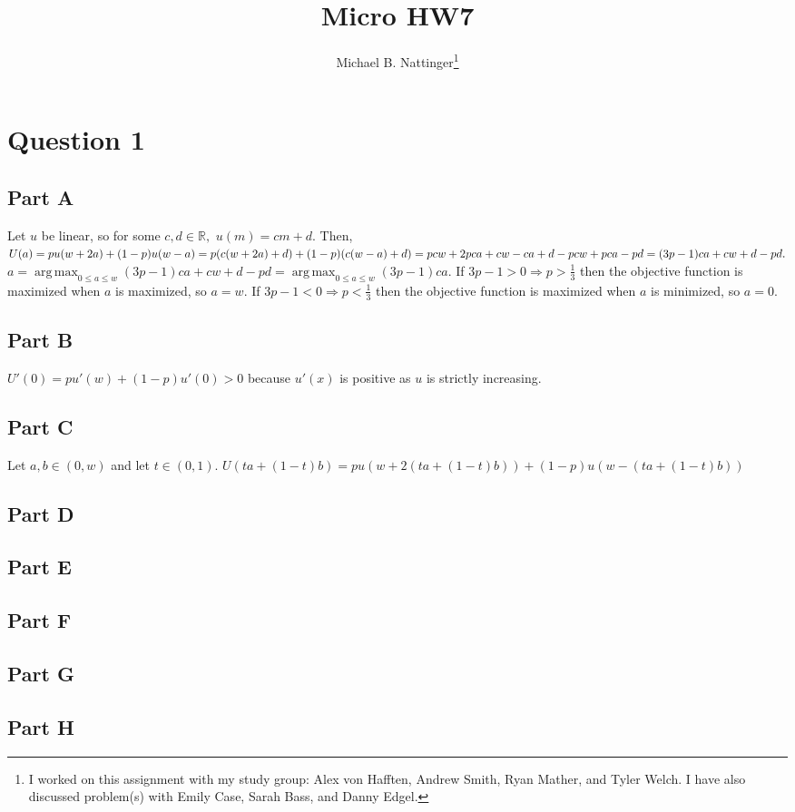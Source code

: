 \documentclass[11pt]{article} %
\title{Micro HW7}
\author{Michael B. Nattinger\footnote{I worked on this assignment with my study group: Alex von Hafften, Andrew Smith, Ryan Mather, and Tyler Welch. I have also discussed problem(s) with Emily Case, Sarah Bass, and Danny Edgel.}}
\DeclareMathOperator*{\argmax}{arg\,max}
\begin{document}
\maketitle

\section{Question 1}
\subsection{Part A}
Let $u$ be linear, so for some $c,d \in \mathbb{R},$ $u(m) = cm + d.$ Then, $U(a) = pu(w+2a ) + (1-p)u(w-a) = p(c(w+2a)+d) + (1-p)(c(w-a)+d) = pcw +2pca + cw - ca + d -pcw +pca -pd \\ =(3p -1)ca  +cw +d  -pd.$ $a = \argmax_{0\leq a\leq w}(3p -1)ca  +cw +d  -pd =  \argmax_{0\leq a\leq w}(3p -1)ca.$ If $3p-1>0 \Rightarrow p>\frac{1}{3}$ then the objective function is maximized when $a$ is maximized, so $a=w$. If $3p-1<0 \Rightarrow p<\frac{1}{3}$ then the objective function is maximized when $a$ is minimized, so $a=0.$
\subsection{Part B}
$U'(0) = pu'(w) +(1-p)u'(0)>0$ because $u'(x)$ is positive as $u$ is strictly increasing.
\subsection{Part C}
Let $a,b \in (0,w)$ and let $t \in (0,1)$. $U(ta+(1-t)b) = pu(w+2(ta+(1-t)b)) +(1-p)u(w-(ta+(1-t)b))$
\subsection{Part D}
\subsection{Part E}
\subsection{Part F}
\subsection{Part G}
\subsection{Part H}
\end{document}
